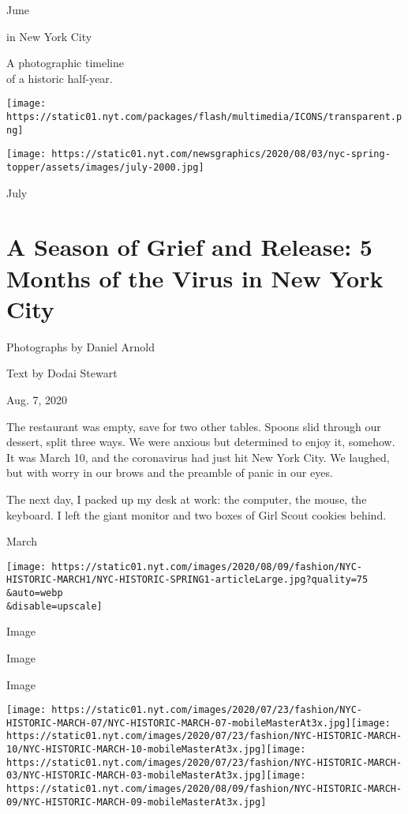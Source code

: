 June

in New York City

A photographic timeline\\
of a historic half-year.

\texttt{[image: https://static01.nyt.com/packages/flash/multimedia/ICONS/transparent.png]}

\texttt{[image: https://static01.nyt.com/newsgraphics/2020/08/03/nyc-spring-topper/assets/images/july-2000.jpg]}

July

\hypertarget{a-season-of-grief-and-release-5-months-of-the-virus-in-new-york-city}{%
\section{A Season of Grief and Release: 5 Months of the Virus in New
York
City}\label{a-season-of-grief-and-release-5-months-of-the-virus-in-new-york-city}}

Photographs by Daniel Arnold

Text by Dodai Stewart

Aug. 7, 2020

The restaurant was empty, save for two other tables. Spoons slid through
our dessert, split three ways. We were anxious but determined to enjoy
it, somehow. It was March 10, and the coronavirus had just hit New York
City. We laughed, but with worry in our brows and the preamble of panic
in our eyes.

The next day, I packed up my desk at work: the computer, the mouse, the
keyboard. I left the giant monitor and two boxes of Girl Scout cookies
behind.

March

\texttt{[image: https://static01.nyt.com/images/2020/08/09/fashion/NYC-HISTORIC-MARCH1/NYC-HISTORIC-SPRING1-articleLarge.jpg?quality=75\\\&auto=webp\\\&disable=upscale]}

Image

Image

Image

\texttt{[image: https://static01.nyt.com/images/2020/07/23/fashion/NYC-HISTORIC-MARCH-07/NYC-HISTORIC-MARCH-07-mobileMasterAt3x.jpg]}\texttt{[image: https://static01.nyt.com/images/2020/07/23/fashion/NYC-HISTORIC-MARCH-10/NYC-HISTORIC-MARCH-10-mobileMasterAt3x.jpg]}\texttt{[image: https://static01.nyt.com/images/2020/07/23/fashion/NYC-HISTORIC-MARCH-03/NYC-HISTORIC-MARCH-03-mobileMasterAt3x.jpg]}\texttt{[image: https://static01.nyt.com/images/2020/08/09/fashion/NYC-HISTORIC-MARCH-09/NYC-HISTORIC-MARCH-09-mobileMasterAt3x.jpg]}

